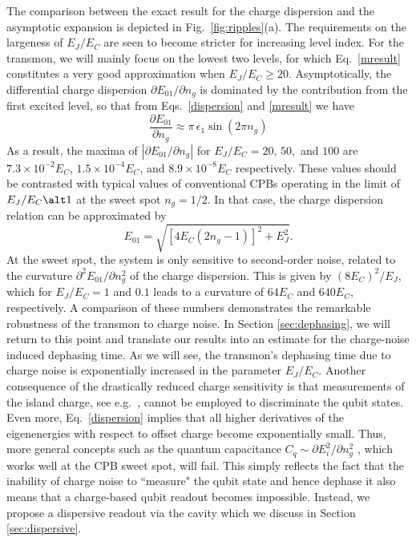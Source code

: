 \documentclass[twocolumn,amsmath,amssymb,floatfix,pra,showpacs,eqsecnum,footinbib,superscriptaddress]{revtex4}
\newcounter{fig}
\newcommand{\abs}[1]{\left|#1\right|}
\newcommand{\be}{\begin{equation}}
\newcommand{\ee}{\end{equation}}
\begin{document}
The comparison between the exact result for the charge dispersion and the asymptotic expansion is depicted in Fig.~\ref{fig:ripples}(a). The requirements on the largeness of $E_J/E_C$ are seen to become stricter for increasing level index. For the transmon, we will mainly focus on the lowest two levels, for which Eq.~\eqref{mresult} constitutes a very good approximation when $E_J/E_C\ge 20$. Asymptotically, the differential charge dispersion $\partial E_{01}/\partial n_g$ is dominated by the contribution from the first excited level, so that from Eqs.~\eqref{dispersion} and \eqref{mresult} we have
\be\label{bgcurvature}
\frac{\partial E_{01}}{\partial n_g} \approx \pi\, \epsilon_1 \sin (2\pi n_g)
\ee
As a result, the maxima of $\abs{\partial E_{01}/\partial n_g}$ for $E_J/E_C=20,\,50,$ and $100$ are $7.3\times 10^{-2}E_C$, $1.5\times 10^{-4}E_C$, and $8.9\times 10^{-8}E_C$ respectively. These values should be contrasted with typical values of conventional CPBs operating in the limit of $E_J/E_C\alt1$ at the sweet spot $n_g=1/2$. In that case, the charge dispersion relation can be approximated by 
\be
E_{01}=\sqrt{[4E_C(2n_g-1)]^2 + E_J^2}.
\ee
At the sweet spot, the system is only sensitive to second-order noise, related to the curvature $\partial^2E_{01}/\partial n_g^2$ of the charge dispersion. This is given by $(8E_C)^2/E_J$, which for $E_J/E_C=1$ and $0.1$ leads to a curvature of $64E_C$ and $640E_C$, respectively. A comparison of these numbers demonstrates the remarkable robustness of the transmon to charge noise.  In Section \ref{sec:dephasing}, we will return to this point and translate our results into an estimate for the charge-noise induced dephasing time. As we will see, the transmon's dephasing time due to charge noise is exponentially increased in the parameter $E_J/E_C$. Another consequence of the drastically reduced charge sensitivity is that measurements of the island charge, see e.g.~\cite{schoelkopf,duty0}, cannot be employed to discriminate the qubit states. Even more, Eq.~\eqref{dispersion} implies that all higher derivatives of the eigenenergies with respect to offset charge become exponentially small. Thus, more general concepts such as the quantum capacitance  $C_q\sim\partial E_{i}^2/\partial n_g^2$ \cite{duty}, which works well at the CPB sweet spot, will fail. This simply reflects the fact that the inability of charge noise to ``measure" the qubit state and hence dephase it also means that a charge-based qubit readout becomes impossible.
Instead, we propose a dispersive readout via the cavity which we discuss in Section \ref{sec:dispersive}.
\end{document}
